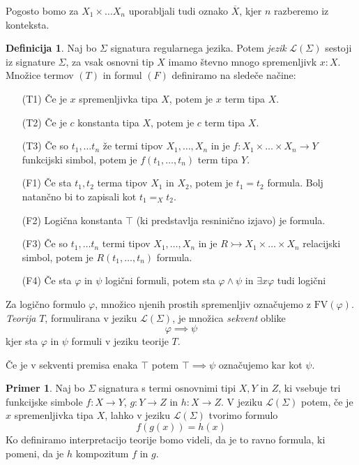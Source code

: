 \documentclass[12pt,a4paper]{book}
\theoremstyle{definition}
\newtheorem{definicija}{Definicija}[chapter]
\theoremstyle{plain}
\theoremstyle{definition}
\newtheorem{primer}{Primer}[section]
\theoremstyle{remark}
\begin{document}
Pogosto bomo za $X_1 \times \ldots X_n$ uporabljali tudi oznako $\overline{X}$, kjer $n$ razberemo iz konteksta.
\begin{definicija}
  Naj bo $\Sigma$ signatura regularnega jezika. Potem \emph{jezik} $\mathcal{L}(\Sigma)$ sestoji iz signature $\Sigma$, za vsak osnovni tip $X$ imamo števno mnogo spremenljivk $x:X$. Množice termov $(T)$ in formul $(F)$ definiramo na sledeče načine:
  \begin{itemize}
    \item [(T1)] Če je $x$ spremenljivka tipa $X$, potem je $x$ term tipa $X$.
    \item [(T2)] Če je $c$ konstanta tipa $X$, potem je $c$ term tipa $X$.
    \item [(T3)] Če so $t_1, \ldots t_n$ že termi tipov $X_1, \ldots, X_n$ in je $f : X_1 \times \ldots \times X_n \to Y$ funkcijski simbol, potem je $f(t_1, \ldots, t_n)$ term tipa $Y$.
    \item [(F1)] Če sta $t_1, t_2$ terma tipov $X_1$ in $X_2$, potem je $t_1 = t_2$ formula. Bolj natančno bi to zapisali kot $t_1 =_X t_2$.
    \item [(F2)] Logična konstanta $\top$ (ki predstavlja resninično izjavo) je formula.
    \item [(F3)] Če so $t_1, \ldots t_n$ termi tipov $X_1, \ldots, X_n$ in je $R \rightarrowtail X_1 \times \ldots \times X_n$ relacijski simbol, potem je $R(t_1, \ldots, t_n)$ formula.
    \item [(F4)] Če sta $\varphi$ in $\psi$ logični formuli, potem sta $\varphi \wedge \psi$ in $\exists x \varphi$ tudi logični 
  \end{itemize}
  Za logično formulo $\varphi$, množico njenih prostih spremenljiv označujemo z $\mathrm{FV}(\varphi)$. \emph{Teorija} $T$, formulirana v jeziku $\mathcal{L}(\Sigma)$, je množica \emph{sekvent} oblike 
  $$\varphi \implies \psi$$
  kjer sta $\varphi$ in $\psi$ formuli v jeziku teorije $T$.
\end{definicija}
Če je v sekventi premisa enaka $\top$ potem $\top \implies \psi$ označujemo kar kot $\psi$.
\begin{primer}
  Naj bo $\Sigma$ signatura s termi osnovnimi tipi $X,Y$ in $Z$, ki vsebuje tri funkcijske simbole $f: X \to Y$, $g : Y \to Z$ in $h : X \to Z$. V jeziku $\mathcal{L}(\Sigma)$ potem, če je $x$ spremenljivka tipa $X$, lahko v jeziku $\mathcal{L}(\Sigma)$ tvorimo formulo
  $$f(g(x)) = h(x)$$
  Ko definiramo interpretacijo teorije bomo videli, da je to ravno formula, ki pomeni, da je $h$ kompozitum $f$ in $g$.
\end{primer}
\end{document}
